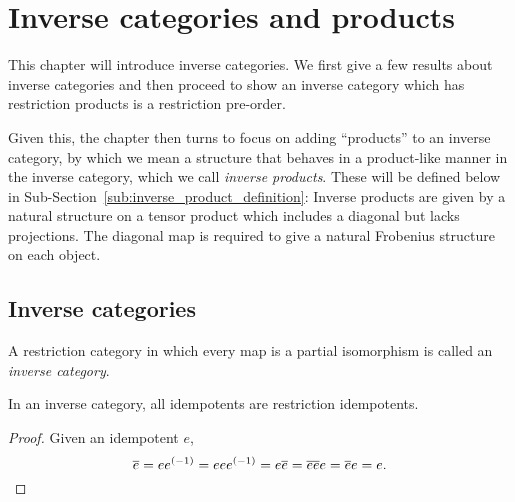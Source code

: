 \chapter{Inverse categories and products} %
\label{cha:inverse_categories}

This chapter will introduce inverse categories. We first give
a few results about inverse categories and then proceed to show an inverse category which has
restriction products is a restriction pre-order.

Given this, the chapter then turns to focus on adding ``products'' to an inverse category, by which
we mean a structure that behaves in a product-like manner in the inverse category, which we call
\emph{inverse products}. These will be defined below in
Sub-Section~\ref{sub:inverse_product_definition}: Inverse products are given by a natural structure
on a tensor product which includes a diagonal but lacks projections. The diagonal map is required to
give a natural Frobenius structure on each object.

\section{Inverse categories}
\label{sec:inverse_categories}

\begin{definition}\label{def:inverse_category}
  A restriction category in which every map is a partial
  isomorphism is called an \emph{inverse category}.
\end{definition}

\begin{lemma}
  \label{lem:inverse_idempotents_are_restriction_idempotents}
  In an inverse category, all idempotents are restriction idempotents.
\end{lemma}
\begin{proof}
  Given an idempotent $e$,
  \[
    \overline{e} = e{e}^{(-1)} = e e {e}^{(-1)} = e \overline{e} = \overline{e e} e = \overline{e} e = e.
  \]
\end{proof}

